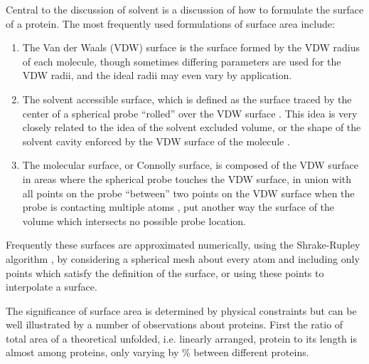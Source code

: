 Central to the discussion of solvent is a discussion of how to formulate the surface of a protein.
The most frequently used formulations of surface area include:
\begin{enumerate}
\item The Van der Waals (VDW) surface is the surface formed by the VDW radius of each molecule, though sometimes differing parameters are used for the VDW radii, and the ideal radii may even vary by application.
\item The solvent accessible surface, which is defined as the surface traced by the center of a spherical probe ``rolled'' over the VDW surface \cite{richards1977areas}.  This idea is very closely related to the idea of the solvent excluded volume, or the shape of the solvent cavity enforced by the VDW surface of the molecule \cite{richmond1984solvent}.
\item The molecular surface, or Connolly surface, is composed of the VDW surface in areas where the spherical probe touches the VDW surface, in union with all points on the probe ``between'' two points on the VDW surface when the probe is contacting multiple atoms \cite{connolly1983analytical}, put another way the surface of the volume which intersects no possible probe location.
\end{enumerate}
Frequently these surfaces are approximated numerically, using the Shrake-Rupley algorithm \cite{shrake1973environment}, by considering a spherical mesh about every atom and including only points which satisfy the definition of the surface, or using these points to interpolate a surface.

The significance of surface area is determined by physical constraints but can be well illustrated by a number of observations about proteins.
First the ratio of total area of a theoretical unfolded, i.e. linearly arranged, protein to its length is almost among proteins, only varying by \% between different proteins.

